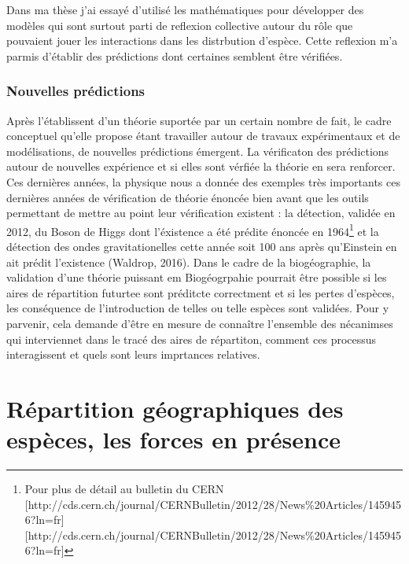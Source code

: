 Dans ma thèse j'ai essayé d'utilisé les mathématiques pour développer
des modèles qui sont surtout parti de reflexion collective autour du
rôle que pouvaient jouer les interactions dans les distrbution d'espèce.
Cette reflexion m'a parmis d'établir des prédictions dont certaines
semblent être vérifiées.

\subsubsection*{Nouvelles prédictions}\label{nouvelles-pruxe9dictions}

Après l'établissent d'un théorie suportée par un certain nombre de fait,
le cadre conceptuel qu'elle propose étant travailler autour de travaux
expérimentaux et de modélisations, de nouvelles prédictions émergent. La
vérificaton des prédictions autour de nouvelles expérience et si elles
sont vérfiée la théorie en sera renforcer. Ces dernières années, la
physique nous a donnée des exemples très importants ces dernières années
de vérification de théorie énoncée bien avant que les outils permettant
de mettre au point leur vérification existent : la détection, validée en
2012, du Boson de Higgs dont l'éxistence a été prédite énoncée en
1964\footnote{Pour plus de détail au bulletin du CERN
  {[}http://cds.cern.ch/journal/CERNBulletin/2012/28/News\%20Articles/1459456?ln=fr{]}{[}http://cds.cern.ch/journal/CERNBulletin/2012/28/News\%20Articles/1459456?ln=fr{]}}
et la détection des ondes gravitationelles cette année soit 100 ans
après qu'Einstein en ait prédit l'existence (Waldrop, 2016). Dans le
cadre de la biogéographie, la validation d'une théorie puissant em
Biogéogrpahie pourrait être possible si les aires de répartition
futurtee sont préditcte correctment et si les pertes d'espèces, les
conséquence de l'introduction de telles ou telle espèces sont validées.
Pour y parvenir, cela demande d'être en mesure de connaître l'ensemble
des nécanimses qui interviennet dans le tracé des aires de répartiton,
comment ces processus interagissent et quels sont leurs imprtances
relatives.

\section*{Répartition géographiques des espèces, les forces en
présence}\label{ruxe9partition-guxe9ographiques-des-espuxe8ces-les-forces-en-pruxe9sence}

